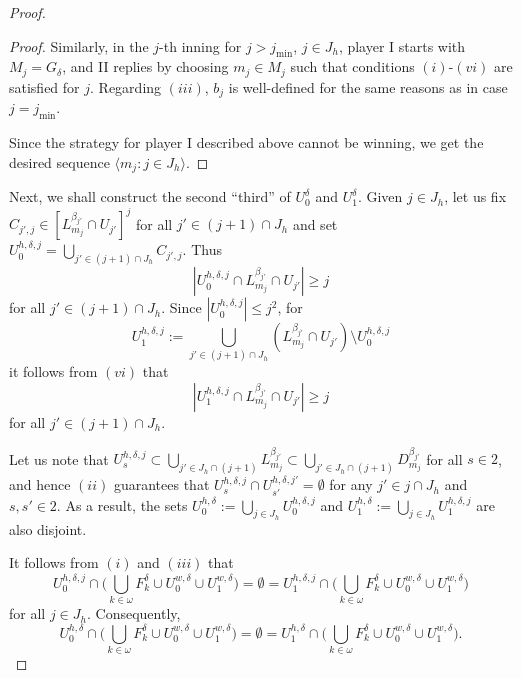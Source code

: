\documentclass[12pt,a4paper]{amsart}
\theoremstyle{definition}
\newcommand{\w}{\omega}
\newcommand{\la}{\langle}
\newcommand{\ra}{\rangle}
\begin{document}
\begin{proof}
\begin{proof}
Similarly, in the $j$-th inning for $j>j_{\min}$, $j\in J_h$,
player I starts with 
$M_j=G_\delta$, and II replies by choosing $m_j\in M_j$
such that conditions $(i)$-$(vi)$ are satisfied for $j$.
Regarding $(iii)$, $b_j$ is well-defined 
for the same reasons as in case $j=j_{\min}$.

Since the strategy for player I described above cannot be winning, we get the
desired sequence $\la m_j:j\in J_h\ra$.
\end{proof}

Next, we shall construct the second ``third'' of
$U^\delta_0$ and $U^\delta_1$.
Given $j\in J_h$, let us fix $C_{j',j}\in [L^{\beta_{j'}}_{m_j}\cap U_{j'}]^j$
for all $j'\in (j+1)\cap J_h$ and set 
$U^{h,\delta,j}_0=\bigcup_{j'\in (j+1)\cap J_h}C_{j',j}$.
Thus 
\begin{equation} \label{h0}
|U^{h,\delta,j}_0\cap L^{\beta_{j'}}_{m_j}\cap U_{j'}|\geq j
\end{equation}
for all $j'\in (j+1)\cap J_h$. 
Since $|U^{h,\delta,j}_0|\leq j^2$, for
\begin{equation}
    U^{h,\delta,j}_1:=\bigcup_{j'\in (j+1)\cap J_h}(L^{\beta_{j'}}_{m_j}\cap U_{j'})\setminus U^{h,\delta,j}_0
\end{equation}
it follows from $(vi)$ that 
\begin{equation} \label{h1}
|U^{h,\delta,j}_1\cap L^{\beta_{j'}}_{m_j}\cap U_{j'}|\geq j
\end{equation} 
for all $j'\in (j+1)\cap J_h$. 

Let us note that $U^{h,\delta,j}_s\subset\bigcup_{j'\in J_h\cap (j+1)}L^{\beta_{j'}}_{m_j}\subset \bigcup_{j'\in J_h\cap (j+1)}D^{\beta_{j'}}_{m_j}$ for all $s\in 2$,
and hence $(ii)$ guarantees that 
$U^{h,\delta,j}_s\cap U^{h,\delta,j'}_{s'} =\emptyset$
for any $j'\in j\cap J_h$ and $s,s'\in 2$. 
As a result, the sets $U^{h,\delta}_0:=\bigcup_{j\in J_h} U^{h,\delta,j}_0$
and $U^{h,\delta}_1:=\bigcup_{j\in J_h} U^{h,\delta,j}_1$
are also disjoint.  

It follows from $(i)$ and $(iii)$ that 
$$U^{h,\delta,j}_0\cap
\big (\bigcup_{k\in \w}F^\delta_k\cup U^{w,\delta}_0\cup U^{w,\delta}_1\big)=\emptyset =
U^{h,\delta,j}_1\cap \big (\bigcup_{k\in \w}F^\delta_k\cup U^{w,\delta}_0\cup U^{w,\delta}_1\big) $$
for all $j\in J_h$.
Consequently, 
\begin{equation} \label{disj_F's}
U^{h,\delta}_0\cap
\big (\bigcup_{k\in \w}F^\delta_k\cup U^{w,\delta}_0\cup U^{w,\delta}_1\big)=\emptyset =
U^{h,\delta}_1\cap \big (\bigcup_{k\in \w}F^\delta_k\cup U^{w,\delta}_0\cup U^{w,\delta}_1\big). 
\end{equation}


\end{proof}
\end{document}
